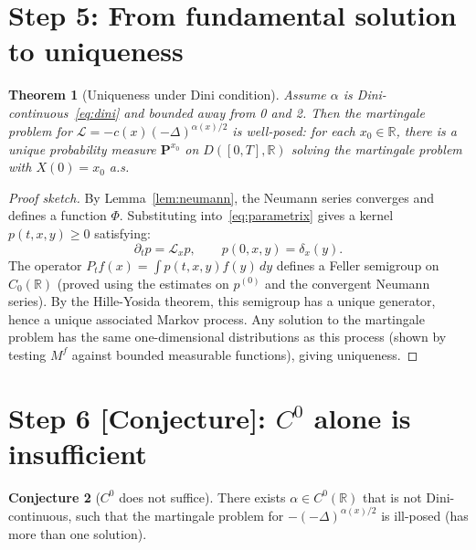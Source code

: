 \documentclass{amsart}
\newtheorem{theorem}{Theorem}[section]
\theoremstyle{definition}
\newtheorem{conjecture}[theorem]{Conjecture}
\begin{document}
\section{Step 5: From fundamental solution to uniqueness}

\begin{theorem}[Uniqueness under Dini condition]
\label{thm:unique}
Assume $\alpha$ is Dini-continuous~\eqref{eq:dini} and bounded away from 0 and 2.
Then the martingale problem for $\mathcal{L}=-c(x)(-\Delta)^{\alpha(x)/2}$ is
well-posed: for each $x_0\in\mathbb{R}$, there is a unique probability measure
$\mathbf{P}^{x_0}$ on $D([0,T],\mathbb{R})$ solving the martingale problem
with $X(0)=x_0$ a.s.
\end{theorem}

\begin{proof}[Proof sketch]
By Lemma~\ref{lem:neumann}, the Neumann series converges and defines a function
$\Phi$. Substituting into~\eqref{eq:parametrix} gives a kernel $p(t,x,y)\geq 0$
satisfying:
\[
    \partial_t p = \mathcal{L}_x p, \qquad p(0,x,y)=\delta_x(y).
\]
The operator $P_t f(x)=\int p(t,x,y)f(y)\,dy$ defines a Feller semigroup on
$C_0(\mathbb{R})$ (proved using the estimates on $p^{(0)}$ and the convergent
Neumann series). By the Hille-Yosida theorem, this semigroup has a unique
generator, hence a unique associated Markov process. Any solution to the
martingale problem has the same one-dimensional distributions as this process
(shown by testing $M^f$ against bounded measurable functions), giving uniqueness.
\end{proof}

\section{Step 6 [Conjecture]: $C^0$ alone is insufficient}

\begin{conjecture}[$C^0$ does not suffice]
\label{conj:c0-fails}
There exists $\alpha\in C^0(\mathbb{R})$ that is not Dini-continuous, such that
the martingale problem for $-(-\Delta)^{\alpha(x)/2}$ is ill-posed (has more than
one solution).
\end{conjecture}
\end{document}
